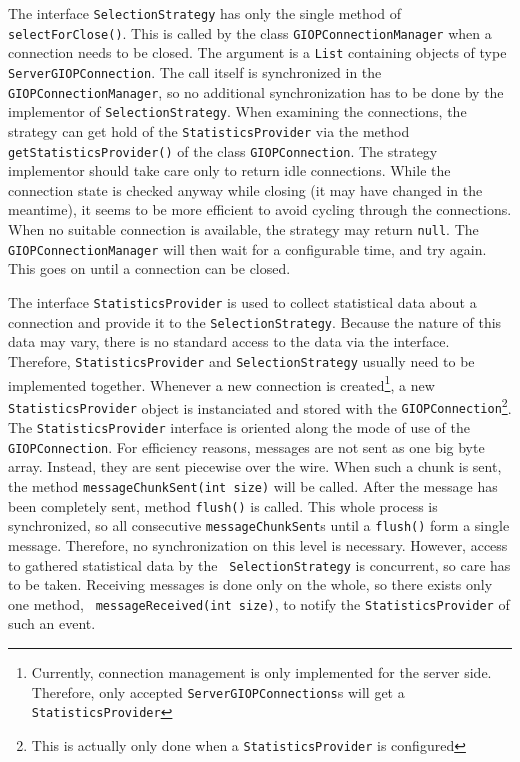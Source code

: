 The interface {\tt SelectionStrategy} has only the single method of {\tt
  selectForClose()}. This is called by the class {\tt GIOPConnectionManager}
when a connection needs to be closed. The argument is a {\tt List} containing
objects of type {\tt ServerGIOPConnection}. The call itself is synchronized in
the {\tt GIOPConnectionManager}, so no additional synchronization has to be
done by the implementor of {\tt SelectionStrategy}. When examining the
connections, the strategy can get hold of the {\tt StatisticsProvider} via the
method {\tt getStatisticsProvider()} of the class {\tt GIOPConnection}. The
strategy implementor should take care only to return idle connections. While
the connection state is checked anyway while closing (it may have changed in
the meantime), it seems to be more efficient to avoid cycling through the
connections. When no suitable connection is available, the strategy may
return {\tt null}. The {\tt GIOPConnectionManager} will then wait for a
configurable time, and try again. This goes on until a connection can be
closed.

The interface {\tt StatisticsProvider} is used to collect statistical data
about a connection and provide it to the {\tt SelectionStrategy}.  Because the
nature of this data may vary, there is no standard access to the data via the
interface. Therefore, {\tt StatisticsProvider} and {\tt SelectionStrategy}
usually need to be implemented together. Whenever a new connection is
created\footnote{Currently, connection management is only implemented for the
server side. Therefore, only accepted {\tt ServerGIOPConnections}s will get a
{\tt StatisticsProvider}}, a new {\tt StatisticsProvider} object is
instanciated and stored with the {\tt GIOPConnection}\footnote{This is
actually only done when a {\tt StatisticsProvider} is configured}.
The {\tt StatisticsProvider} interface is oriented along the mode of use of the {\tt
GIOPConnection}. For efficiency reasons, messages are not sent as one big byte
array. Instead, they are sent piecewise over the wire. When such a chunk is
sent, the method {\tt messageChunkSent(int size)} will be called. After the
message has been completely sent, method {\tt flush()} is called. This whole
process is synchronized, so all consecutive {\tt messageChunkSent}s until a
{\tt flush()} form a single message. Therefore, no synchronization on this
level is necessary. However, access to gathered statistical data by the {\tt
SelectionStrategy} is concurrent, so care has to be taken. Receiving messages
is done only on the whole, so there exists only one method, {\tt
messageReceived(int size)}, to notify the {\tt StatisticsProvider} of such an
event.


